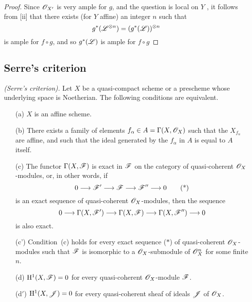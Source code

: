 \begin{proof}
Since $\mathscr{O}_{X'}$ is very ample for $g$, and the question is local on $Y$ , it follows from [ii] that there exists (for $Y$ affine) an integer $n$ such that
\[
  g^*(\mathscr{L}^{\otimes n})=(g^*(\mathscr{L}))^{\otimes n}
\]
is ample for $f\circ g$, and so $g^*(\mathscr{L})$ is ample for $f\circ g$ 
\end{proof}

\subsection{Serre's criterion}
\label{subsection:II.5.2}

\begin{theorem}[5.2.1]
\label{II.5.2.1}
\emph{(Serre's criterion).}
Let $X$ be a quasi-compact scheme or a prescheme whose underlying space is Noetherian.
The following conditions are equivalent.
\begin{enumerate}
  \item[{\rm(a)}] $X$ is an affine scheme.
  \item[{\rm(b)}] There exists a family of elements $f_\alpha\in A=\Gamma(X,\mathscr{O}_X)$ such that the $X_{f_\alpha}$ are affine, and such that the ideal generated by the $f_\alpha$ in $A$ is equal to $A$ itself.
  \item[{\rm(c)}] The functor $\Gamma(X,\mathscr{F})$ is exact in $\mathscr{F}$ on the category of quasi-coherent $\mathscr{O}_X$-modules, or, in other words, if
    \[
      0\to\sh{F}'\to\sh{F}\to\sh{F}''\to 0
      \tag{*}
    \]
    is an exact sequence of quasi-coherent $\mathscr{O}_X$-modules, then the sequence
    \[
     0\to\Gamma(X,\sh{F}')\to\Gamma(X,\sh{F})\to\Gamma(X,\sh{F}'')\to 0
    \]
    is also exact.
  \item[{\rm(c')}] Condition~{\rm(c)} holds for every exact sequence {\rm($*$)} of quasi-coherent $\mathscr{O}_X$-modules such that $\mathscr{F}$ is isomorphic to a $\mathscr{O}_X$-submodule of $\mathscr{O}_X^n$ for some finite $n$.
  \item[{\rm(d)}] $\mathrm{H}^1(X,\mathscr{F})=0$ for every quasi-coherent $\mathscr{O}_X$-module $\mathscr{F}$.
  \item[{\rm(d$'$)}] $\mathrm{H}^1(X,\mathscr{J})=0$ for every quasi-coherent sheaf of ideals $\mathscr{J}$ of $\mathscr{O}_X$.
\end{enumerate}
\end{theorem}

